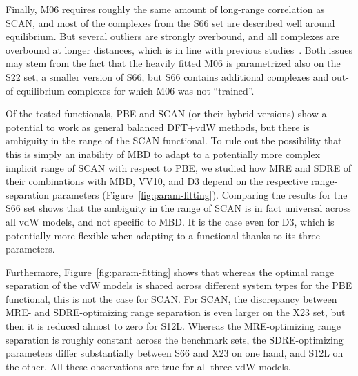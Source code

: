 Finally, M06 requires roughly the same amount of long-range correlation as SCAN, and most of the complexes from the S66 set are described well around equilibrium.
But several outliers are strongly overbound, and all complexes are overbound at longer distances, which is in line with previous studies~\cite{GoerigkJPCL15}.
Both issues may stem from the fact that the heavily fitted M06 is parametrized also on the S22 set, a smaller version of S66, but S66 contains additional complexes and out-of-equilibrium complexes for which M06 was not ``trained''.

Of the tested functionals, PBE and SCAN (or their hybrid versions) show a potential to work as general balanced DFT+vdW methods, but there is ambiguity in the range of the SCAN functional.
To rule out the possibility that this is simply an inability of MBD to adapt to a potentially more complex implicit range of SCAN with respect to PBE, we studied how MRE and SDRE of their combinations with MBD, VV10, and D3 depend on the respective range-separation parameters (Figure~\ref{fig:param-fitting}).
Comparing the results for the S66 set shows that the ambiguity in the range of SCAN is in fact universal across all vdW models, and not specific to MBD\@.
It is the case even for D3, which is potentially more flexible when adapting to a functional thanks to its three parameters.

Furthermore, Figure~\ref{fig:param-fitting} shows that whereas the optimal range separation of the vdW models is shared across different system types for the PBE functional, this is not the case for SCAN\@.
For SCAN, the discrepancy between MRE- and SDRE-optimizing range separation is even larger on the X23 set, but then it is reduced almost to zero for S12L.
Whereas the MRE-optimizing range separation is roughly constant across the benchmark sets, the SDRE-optimizing parameters differ substantially between S66 and X23 on one hand, and S12L on the other.
All these observations are true for all three vdW models.

